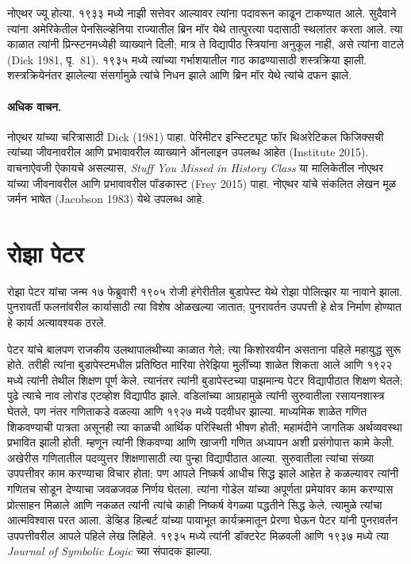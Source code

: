 नोएथर ज्यू होत्या. १९३३ मध्ये नाझी सत्तेवर आल्यावर त्यांना पदावरून काढून टाकण्यात आले. सुदैवाने त्यांना अमेरिकेतील पेनसिल्व्हेनिया राज्यातील ब्रिन मॉर येथे तात्पुरत्या पदासाठी स्थलांतर करता आले. त्या काळात त्यांनी प्रिन्स्टनमध्येही व्याख्याने दिली; मात्र ते विद्यापीठ स्त्रियांना अनुकूल नाही, असे त्यांना वाटले (Dick 1981, पृ.~81). १९३५ मध्ये त्यांच्या गर्भाशयातील गाठ काढण्यासाठी शस्त्रक्रिया झाली. शस्त्रक्रियेनंतर झालेल्या संसर्गामुळे त्यांचे निधन झाले आणि ब्रिन मॉर येथे त्यांचे दफन झाले.

\paragraph{अधिक वाचन.}
नोएथर यांच्या चरित्रासाठी Dick (1981) पाहा. पेरिमीटर इन्स्टिट्यूट फॉर थिअरेटिकल फिजिक्सची त्यांच्या जीवनावरील आणि प्रभावावरील व्याख्याने ऑनलाइन उपलब्ध आहेत (Institute 2015). वाचनाऐवजी ऐकायचे असल्यास, \emph{Stuff You Missed in History Class} या मालिकेतील नोएथर यांच्या जीवनावरील आणि प्रभावावरील पॉडकास्ट (Frey 2015) पाहा. नोएथर यांचे संकलित लेखन मूळ जर्मन भाषेत (Jacobson 1983) येथे उपलब्ध आहे.













\section{रोझा पेटर}\label{his:bio:pet:sec}



रोझा पेटर यांचा जन्म १७ फेब्रुवारी १९०५ रोजी हंगेरीतील बुडापेस्ट येथे रोझा पोलित्झर या नावाने झाला. पुनरावर्ती फलनांवरील कार्यासाठी त्या विशेष ओळखल्या जातात; पुनरावर्तन उपपत्ती हे क्षेत्र निर्माण होण्यात हे कार्य अत्यावश्यक ठरले.

पेटर यांचे बालपण राजकीय उलथापालथीच्या काळात गेले; त्या किशोरवयीन असताना पहिले महायुद्ध सुरू होते. तरीही त्यांना बुडापेस्टमधील प्रतिष्ठित मारिया तेरेझिया मुलींच्या शाळेत शिकता आले आणि १९२२ मध्ये त्यांनी तेथील शिक्षण पूर्ण केले. त्यानंतर त्यांनी बुडापेस्टच्या पाझमान्य पेटर विद्यापीठात शिक्षण घेतले; पुढे त्याचे नाव लोरांड एटव्होश विद्यापीठ झाले. वडिलांच्या आग्रहामुळे त्यांनी सुरुवातीला रसायनशास्त्र घेतले, पण नंतर गणिताकडे वळल्या आणि १९२७ मध्ये पदवीधर झाल्या. माध्यमिक शाळेत गणित शिकवण्याची पात्रता असूनही त्या काळची आर्थिक परिस्थिती भीषण होती; महामंदीने जागतिक अर्थव्यवस्था प्रभावित झाली होती. म्हणून त्यांनी शिकवण्या आणि खाजगी गणित अध्यापन अशी प्रसंगोपात्त कामे केली. अखेरीस गणितातील पदव्युत्तर शिक्षणासाठी त्या पुन्हा विद्यापीठात आल्या. सुरुवातीला त्यांचा संख्या उपपत्तीवर काम करण्याचा विचार होता; पण आपले निष्कर्ष आधीच सिद्ध झाले आहेत हे कळल्यावर त्यांनी गणितच सोडून देण्याचा जवळजवळ निर्णय घेतला. त्यांना गोडेल यांच्या अपूर्णता प्रमेयांवर काम करण्यास प्रोत्साहन मिळाले आणि नकळत त्यांनी त्यांचे काही निष्कर्ष वेगळ्या पद्धतीने सिद्ध केले. त्यामुळे त्यांचा आत्मविश्वास परत आला. डेव्हिड हिल्बर्ट यांच्या पायाभूत कार्यक्रमातून प्रेरणा घेऊन पेटर यांनी पुनरावर्तन उपपत्तीवरील आपले पहिले लेख लिहिले. १९३५ मध्ये त्यांनी डॉक्टरेट मिळवली आणि १९३७ मध्ये त्या \emph{Journal of
  Symbolic Logic} च्या संपादक झाल्या.

